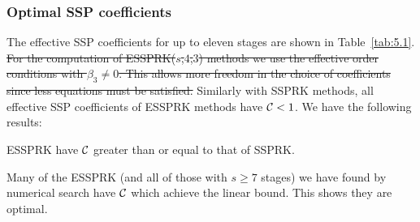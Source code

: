 \subsubsection{Optimal SSP coefficients\label{subsection3.1.2}}

The effective SSP coefficients for up to eleven stages are shown in Table~\ref{tab:5.1}.
\sout{For the computation of ESSPRK(\( s \),\( 4 \),\( 3 \)) methods we use the effective order conditions with \( \beta_{3} \neq 0 \). This allows more freedom in the choice of coefficients since less equations must be satisfied.}
Similarly with SSPRK methods, all effective SSP coefficients of ESSPRK methods have \( \mathcal{C} < 1 \). We have the following results:

\begin{result}
  ESSPRK have $\mathcal{C}$ greater than or equal to that of SSPRK.
\end{result}

\begin{result}
  Many of the ESSPRK (and all of those with $s \ge 7$ stages) we have
  found by numerical search have $\mathcal{C}$ which achieve the linear
  bound.  This shows they are optimal.  
\end{result}

